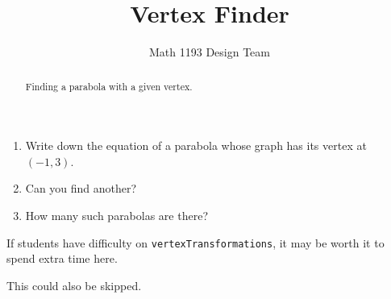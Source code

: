 \documentclass[noauthor]{ximera}
\title{Vertex Finder}
\author{Math 1193 Design Team}
\begin{document}
\begin{abstract}
    Finding a parabola with a given vertex.
\end{abstract}
\maketitle

\begin{enumerate}
    \item Write down the equation of a parabola whose graph has
    its vertex at \((-1, 3)\).
    \item Can you find another?
    \item How many such parabolas are there?
\end{enumerate}

\begin{instructorNotes}
If students have difficulty on \verb+vertexTransformations+, it may 
be worth it to spend extra time here. 

This could also be skipped.
\end{instructorNotes}
\end{document}
